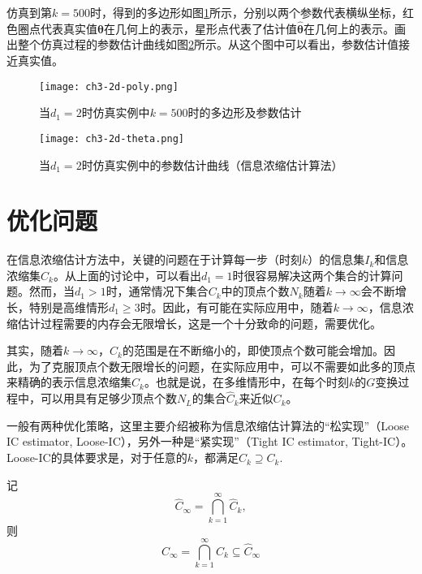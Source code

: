 仿真到第$k=500$时，得到的多边形如图\ref{fig.3.poly}所示，分别以两个参数代表横纵坐标，红色圈点代表真实值$\bm{\theta}$在几何上的表示，星形点代表了估计值$\hat{\bm{\theta}}$在几何上的表示。画出整个仿真过程的参数估计曲线如图\ref{fig.3.theta.hat}所示。从这个图中可以看出，参数估计值接近真实值。
\begin{figure}[!h]
	\centering
	\texttt{[image: ch3-2d-poly.png]}\\	 %
	\caption{当$d_{1}=2$时仿真实例中$k=500$时的多边形及参数估计}
	\label{fig.3.poly}
\end{figure}

\begin{figure}[h]
	\centering
	\texttt{[image: ch3-2d-theta.png]}\\	 %
	\caption{当$d_{1}=2$时仿真实例中的参数估计曲线（信息浓缩估计算法）}
	\label{fig.3.theta.hat}
\end{figure}

\section{优化问题}\label{sect:3.5}
在信息浓缩估计方法中，关键的问题在于计算每一步（时刻$k$）的信息集$I_{k}$和信息浓缩集$C_{k}$。从上面的讨论中，可以看出$d_{1}=1$时很容易解决这两个集合的计算问题。然而，当$d_{1}>1$时，通常情况下集合$C_{k}$中的顶点个数$N_{k}$随着$k\rightarrow\infty$会不断增长，特别是高维情形$d_{1}\geq3$时。因此，有可能在实际应用中，随着$k\rightarrow\infty$，信息浓缩估计过程需要的内存会无限增长，这是一个十分致命的问题，需要优化。

其实，随着$k\rightarrow\infty$，$C_{k}$的范围是在不断缩小的，即使顶点个数可能会增加。因此，为了克服顶点个数无限增长的问题，在实际应用中，可以不需要如此多的顶点来精确的表示信息浓缩集$C_{k}$。也就是说，在多维情形中，在每个时刻$k$的$G$变换过程中，可以用具有足够少顶点个数$N_{L}$的集合$\hat{C}_{k}$来近似$C_{k}$。

一般有两种优化策略，这里主要介绍被称为信息浓缩估计算法的“松实现”（Loose IC estimator, Loose-IC），另外一种是“紧实现”（Tight IC estimator, Tight-IC）。Loose-IC的具体要求是，对于任意的$k$，都满足$\hat{C}_k\supseteq C_k$.

记$$\hat{C}_{\infty}=\bigcap\limits_{k=1}^{\infty} \hat{C}_{k},$$
则
\begin{equation}\label{eq.loose}
C_{\infty}=\bigcap\limits_{k=1}^{\infty} C_{k}\subseteq \hat{C}_{\infty}
\end{equation}


